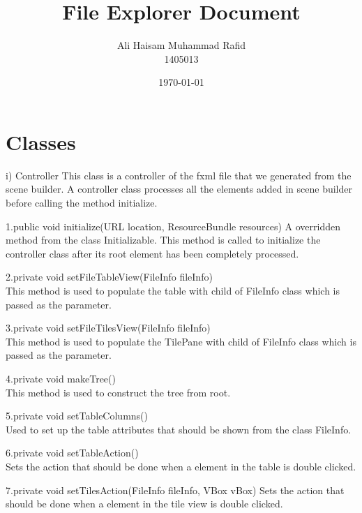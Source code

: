 \documentclass{article}
\title{File Explorer Document}
\author{Ali Haisam Muhammad Rafid\\1405013}
\date{\today}
\begin{document}
	\maketitle
	\newenvironment{class}{\begin{description}[font = \bfseries \ttfamily]}{\end{description}}
	\newenvironment{method}{\begin{description}[font = \normalfont \ttfamily]}{\end{description}}
	\section*{Classes}
	\begin{class}
		\item[ i) Controller] \hfill \break
		This class is a controller of the fxml file that we generated from the scene builder. A controller class processes all the elements added in scene builder before calling the method initialize.
		\begin{method}
			\item[1.public void initialize(URL location, ResourceBundle resources)] A overridden method from the class Initializable. This method is called to initialize the controller class after its root element has been completely processed.
			\item[2.private void setFileTableView(FileInfo fileInfo)] ~\\This method is used to populate the table with child of FileInfo class which is passed as the parameter.
			\item[3.private void setFileTilesView(FileInfo fileInfo)] ~\\This method is used to populate the TilePane with child of FileInfo class which is passed as the parameter.
			\item[4.private void makeTree()] ~\\This method is used to construct the tree from root.
			\item[5.private void setTableColumns()] ~\\Used to set up the table attributes that should be shown from the class FileInfo.
			\item[6.private void setTableAction()] ~\\Sets the action that should be done when a element in the table is double clicked. 
			\item[7.private void setTilesAction(FileInfo fileInfo, VBox vBox)] Sets the action that should be done when a element in the tile view is double clicked.

\end{method}
\end{class}
\end{document}
